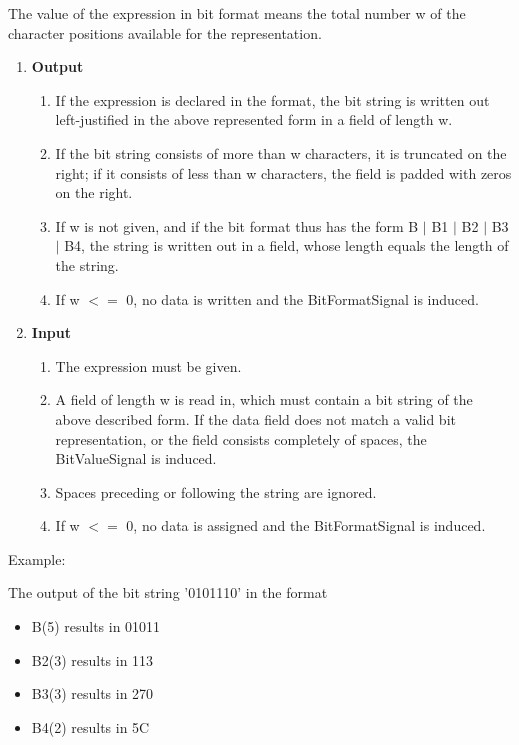 The value of the expression in bit format means the total number w of
the character positions available for the representation.
\begin{enumerate}
\item {\bf Output}\\
\begin{enumerate}
\item If the expression is declared in the format, the bit string is written
out left-justified in the above represented form in a field of length
w. 
\item If the bit string consists of more than w characters, it is truncated
on the right; if it consists of less than w characters, the field is
padded with zeros on the right. 
\item If w is not given, and if the bit format
thus has the form B $\mid$ B1 $\mid$ B2 $\mid$ B3 $\mid$ B4, the string
is written out in a field, whose length equals the length of the
string.
\item If w $<=$ 0, no data is written and the BitFormatSignal is induced.
\end{enumerate}
\item {\bf Input}\\
\begin{enumerate}
\item The expression must be given.
\item A field of length w is read in, which must contain a bit string of the
above described form.
If the data field does not match a valid bit representation, 
or the field consists completely of spaces,
the
BitValueSignal is induced.
\item Spaces preceding or following the string are ignored.

\item If w $<=$ 0, no data is assigned and the BitFormatSignal is induced.


\end{enumerate}
\end{enumerate}

Example:

The output of the bit string '0101110' in the format

\begin{itemize}
\item B(5) results in 01011 
\item B2(3) results in 113 
\item B3(3) results in 270 
\item B4(2) results in 5C
\end{itemize}

